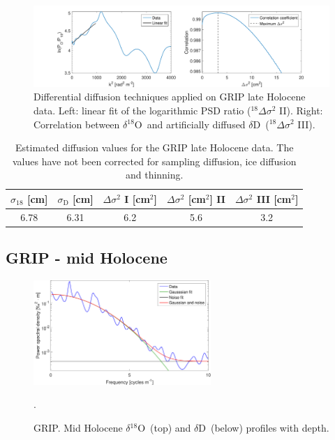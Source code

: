 \documentclass[11pt, draftcls, onecolumn]{IEEEtran} %
\numberwithin{equation}{section}
\numberwithin{table}{section}
\numberwithin{figure}{section}
\newcommand{\delOx}{$\delta{}^{18}\mathrm{O}$}
\newcommand{\delD}{$\delta\mathrm{D}$}
\begin{document}
\begin{appendices}
\begin{figure}[H]
	\vspace*{2mm}
	\begin{center}
		\includegraphics[width=1\textwidth]{Figure_35}
		\caption{Differential diffusion techniques applied on GRIP late Holocene data. 
			Left: linear fit of the logarithmic PSD ratio ($^{18}\Delta\sigma^2$ II). Right: 
			Correlation between \delOx~and artificially diffused \delD~($^{18}\Delta\sigma^2$ III).}  \label{fig:GRIP_late_fig_2}
	\end{center}
\end{figure}

\begin{table}[H]
	\center
	\caption{Estimated diffusion values for the GRIP late Holocene data.
		The values have not been corrected for sampling diffusion, ice diffusion and thinning.}
	\label{GRIP_late_holo}
	\begin{tabular}{c c c c c} 
		\toprule
		$\sigma_{18}$ [cm] & $\sigma_\mathrm{D}$ [cm] & $\Delta\sigma^2$ I [cm$^2$] & $\Delta\sigma^2$ [cm$^2$] II & $\Delta\sigma^2$ III [cm$^2$] \\
		\midrule
6.78 &   6.31 &     6.2 &     5.6 &     3.2 \\
		\bottomrule		
	\end{tabular}
\end{table}

\clearpage
\subsection{GRIP - mid Holocene}

\begin{figure}[H]
	\vspace*{2mm}
	\begin{center}
		\includegraphics[width=0.6\textwidth]{Figure_36}
		\caption{GRIP. Mid Holocene \delOx~(top) and \delD~(below) profiles with depth.}  \label{fig:GRIP_mid_holo}.
	\end{center}
\end{figure}


\end{appendices}
\end{document}
